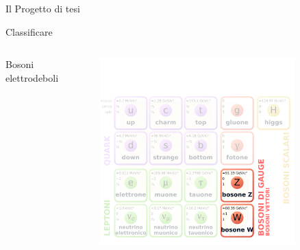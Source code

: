 \documentclass{beamer}
\begin{document}
\begin{frame}{Il Progetto di tesi}
%
  \vspace*{-3.5ex}
  \begin{center}
    \Large
    Classificare
  \end{center}
  \vspace*{-1.5ex}
  \begin{columns}[T]
      \begin{block}{}
        \centering%
        Bosoni elettrodeboli
      \end{block}
      \begin{figure}
        \centering
        \includegraphics[width=\textwidth]{./Images/sm_overview-flat.pdf}
      \end{figure}
      \begin{flushleft}
        \vspace{-3ex}
      \end{flushleft}
      {
}
\end{columns}
\end{frame}
\end{document}
